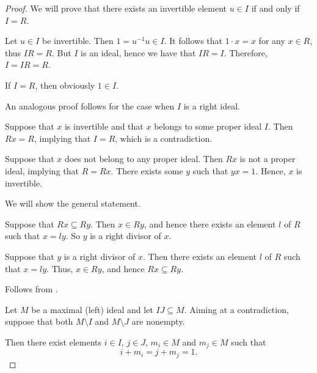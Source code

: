 \begin{proof}
   We will prove that there exists an invertible element \( u \in I \) if and only if \( I = R \).

  \SufficiencySubProof* Let \( u \in I \) be invertible. Then \( 1 = u^{-1} u \in I \). It follows that \( 1 \cdot x = x \) for any \( x \in R \), thus \( IR = R \). But \( I \) is an ideal, hence we have that \( IR = I \). Therefore, \( I = IR = R \).

  \NecessitySubProof* If \( I = R \), then obviously \( 1 \in I \).

  An analogous proof follows for the case when \( I \) is a right ideal.


  \SufficiencySubProof* Suppose that \( x \) is invertible and that \( x \) belongs to some proper ideal \( I \). Then \( Rx = R \), implying that \( I = R \), which is a contradiction.

  \NecessitySubProof* Suppose that \( x \) does not belong to any proper ideal. Then \( Rx \) is not a proper ideal, implying that \( R = Rx \). There exists some \( y \) such that \( yx = 1 \). Hence, \( x \) is invertible.

   We will show the general statement.

  \SufficiencySubProof* Suppose that \( Rx \subseteq Ry \). Then \( x \in Ry \), and hence there exists an element \( l \) of \( R \) such that \( x = ly \). So \( y \) is a right divisor of \( x \).

  \NecessitySubProof* Suppose that \( y \) is a right divisor of \( x \). Then there exists an element \( l \) of \( R \) such that \( x = ly \). Thus, \( x \in Ry \), and hence \( Rx \subseteq Ry \).

   Follows from .

   Let \( M \) be a maximal (left) ideal and let \( IJ \subseteq M \). Aiming at a contradiction, suppose that both \( M \setminus I \) and \( M \setminus J \) are nonempty.

  Then there exist elements \( i \in I \), \( j \in J \), \( m_i \in M \) and \( m_j \in M \) such that
  \begin{equation*}
    i + m_i = j + m_j = 1.
  \end{equation*}


\end{proof}
